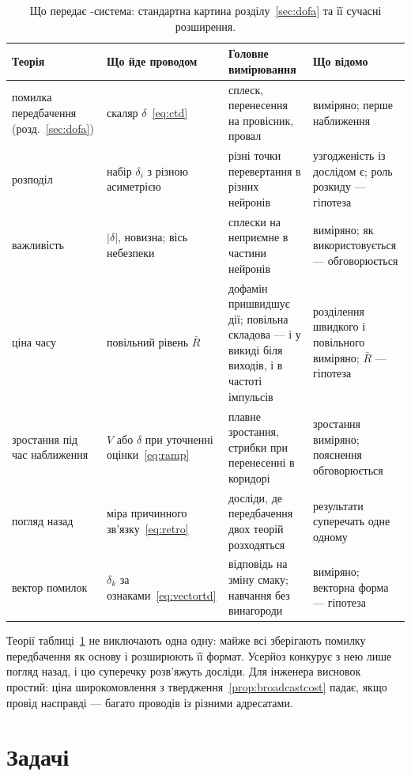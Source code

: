 \begin{table}[t]
\centering
\footnotesize
\setlength{\tabcolsep}{4pt}
\renewcommand{\arraystretch}{1.15}
\begin{tabular}{>{\raggedright}p{2.5cm}>{\raggedright}p{3.2cm}>{\raggedright}p{3.6cm}>{\raggedright\arraybackslash}p{4.2cm}}
\toprule
Теорія & Що йде проводом & Головне вимірювання & Що відомо \\
\midrule
помилка передбачення (розд.~\ref{sec:dofa}) & скаляр $\delta$~\eqref{eq:ctd} & сплеск, перенесення на провісник, провал & виміряно; перше наближення \\
розподіл & набір $\delta_i$ з різною асиметрією & різні точки перевертання в різних нейронів & узгодженість із дослідом є; роль розкиду --- гіпотеза \\
важливість & $|\delta|$, новизна; вісь небезпеки & сплески на неприємне в частини нейронів & виміряно; як використовується --- обговорюється \\
ціна часу & повільний рівень $\bar R$ & дофамін пришвидшує дії; повільна складова --- і у викиді біля виходів, і в частоті імпульсів & розділення швидкого і повільного виміряно; $\bar R$ --- гіпотеза \\
зростання під час наближення & $V$ або $\delta$ при уточненні оцінки~\eqref{eq:ramp} & плавне зростання, стрибки при перенесенні в коридорі & зростання виміряно; пояснення обговорюється \\
погляд назад & міра причинного зв'язку~\eqref{eq:retro} & досліди, де передбачення двох теорій розходяться & результати суперечать одне одному \\
вектор помилок & $\delta_k$ за ознаками~\eqref{eq:vectortd} & відповідь на зміну смаку; навчання без винагороди & виміряно; векторна форма --- гіпотеза \\
\bottomrule
\end{tabular}
\caption{Що передає -система: стандартна картина розділу~\ref{sec:dofa} та її сучасні розширення.}
\label{tab:dofaalt}
\end{table}

Теорії таблиці~\ref{tab:dofaalt} не виключають одна одну: майже всі зберігають помилку передбачення як основу і розширюють її формат. Усерйоз конкурує з нею лише погляд назад, і цю суперечку розв'яжуть досліди. Для інженера висновок простий: ціна широкомовлення з твердження~\ref{prop:broadcastcost} падає, якщо провід насправді --- багато проводів із різними адресатами.

\section{Задачі}

